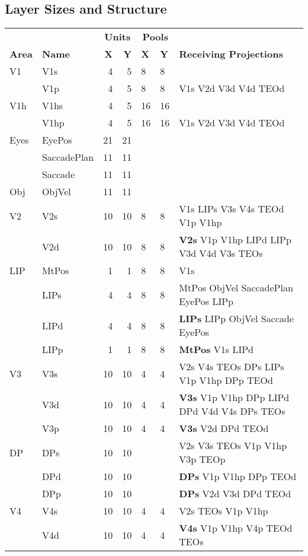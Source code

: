 \documentclass[12pt,twoside]{article}
\newif\myifpdf
\begin{document}
\subsection{Layer Sizes and Structure}

\begin{table}
  \centering
\begin{tabular}{llrrlll}
\hline
     &      & \multicolumn{2}{c}{{\bf Units}} & \multicolumn{2}{c}{{\bf Pools}} & \\
{\bf Area} & {\bf Name} & {\bf X} & {\bf Y} & {\bf X} & {\bf Y} & {\bf Receiving Projections} \\
\hline
V1 & V1s & 4 & 5 & 8 & 8 &  \\
   & V1p & 4 & 5 & 8 & 8 & V1s V2d V3d V4d TEOd  \\
V1h & V1hs & 4 & 5 & 16 & 16 &  \\
   & V1hp & 4 & 5 & 16 & 16 & V1s V2d V3d V4d TEOd  \\
Eyes & EyePos & 21 & 21 & & &  \\
     & SaccadePlan & 11 & 11 & & &  \\
     & Saccade & 11 & 11 & & &  \\
Obj & ObjVel & 11 & 11 & & & \\
V2 & V2s & 10 & 10 & 8 & 8 & V1s LIPs V3s V4s TEOd V1p V1hp \\
   & V2d & 10 & 10 & 8 & 8 & {\bf V2s} V1p V1hp LIPd LIPp V3d V4d V3s TEOs \\
LIP & MtPos& 1 & 1 & 8 & 8 & V1s \\
    & LIPs & 4 & 4 & 8 & 8 & MtPos ObjVel SaccadePlan EyePos LIPp \\
    & LIPd & 4 & 4 & 8 & 8 & {\bf LIPs} LIPp ObjVel Saccade EyePos \\
    & LIPp & 1 & 1 & 8 & 8 & {\bf MtPos} V1s LIPd \\
V3 & V3s & 10 & 10 & 4 & 4 & V2s V4s TEOs DPs LIPs V1p V1hp DPp TEOd \\
   & V3d & 10 & 10 & 4 & 4 & {\bf V3s} V1p V1hp DPp LIPd DPd V4d V4s DPs TEOs \\
   & V3p & 10 & 10 & 4 & 4 & {\bf V3s} V2d DPd TEOd \\
DP & DPs & 10 & 10 & & & V2s V3s TEOs V1p V1hp V3p TEOp \\
   & DPd & 10 & 10 & & & {\bf DPs} V1p V1hp DPp TEOd \\
   & DPp & 10 & 10 & & & {\bf DPs} V2d V3d DPd TEOd \\
V4 & V4s & 10 & 10 & 4 & 4 & V2s TEOs V1p V1hp \\
   & V4d & 10 & 10 & 4 & 4 & {\bf V4s} V1p V1hp V4p TEOd TEOs \\

\end{tabular}
\end{table}
\end{document}
